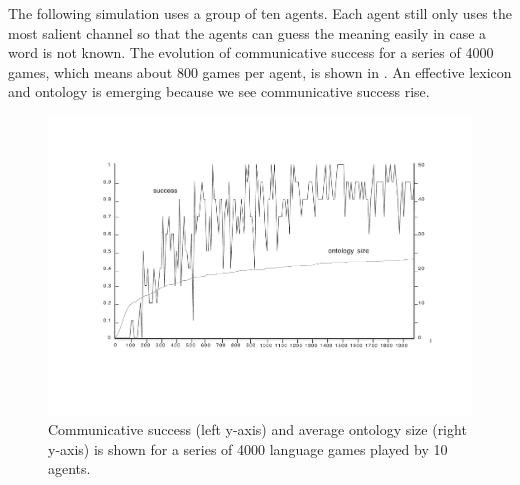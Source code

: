The following simulation uses a group of ten agents. 
Each agent still only uses the most salient channel so that 
the agents can guess the meaning easily in case a word is not known. 
The evolution of communicative success for a series of 
4000 games, which means about 800 games per agent, 
is shown in . 
An effective lexicon and ontology is 
emerging because we see communicative success rise. 
\begin{figure}[htbp]
  \centerline{\includegraphics[width=.70\textwidth]{chap6/figs/gsucc2}}
\caption{\label{gsucc2} Communicative 
success (left y-axis) and average ontology size 
(right y-axis) is shown for a series of 4000
language games played by 10 agents.} 
\end{figure}

